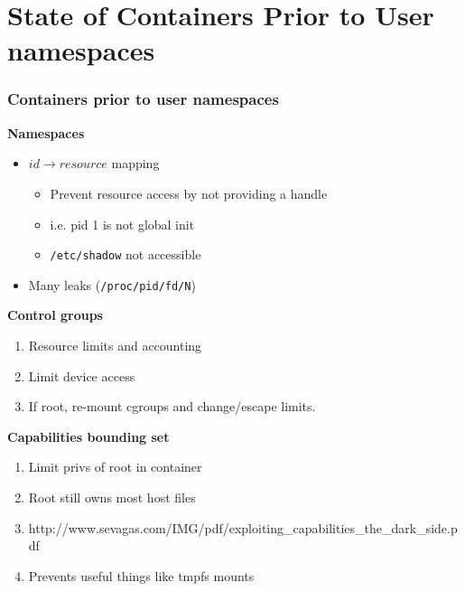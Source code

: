 \documentclass{beamer}
\begin{document}
\section{State of Containers Prior to User namespaces} %
\begin{frame}
\frametitle{Containers prior to user namespaces}
\textbf{Namespaces}
\begin{itemize}
\item $id \rightarrow resource$ mapping
	\begin{itemize}
	\item Prevent resource access by not providing a handle
	\item i.e. pid 1 is not global init
	\item {\tt /etc/shadow} not accessible
	\end{itemize}
\item Many leaks ({\tt /proc/pid/fd/N})
\end{itemize}

\textbf{Control groups}
\begin{enumerate}
\item Resource limits and accounting
\item Limit device access
\item If root, re-mount cgroups and change/escape limits.
\end{enumerate}

\vspace{.25in}

\textbf{Capabilities bounding set}
\begin{enumerate}
\item Limit privs of root in container
\item Root still owns most host files
\item {\tiny http://www.sevagas.com/IMG/pdf/exploiting\_capabilities\_the\_dark\_side.pdf}
\item Prevents useful things like tmpfs mounts
\end{enumerate}
\end{frame}
\end{document}
